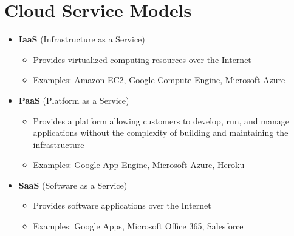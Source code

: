 \section{Cloud Service Models}
\begin{itemize}
   \item \textbf{IaaS} (Infrastructure as a Service)
   \begin{itemize}
      \item Provides virtualized computing resources over the Internet
      \item Examples: Amazon EC2, Google Compute Engine, Microsoft Azure
   \end{itemize}
   \item \textbf{PaaS} (Platform as a Service)
   \begin{itemize}
      \item Provides a platform allowing customers to develop, run, and manage applications without the complexity of building and maintaining the infrastructure
      \item Examples: Google App Engine, Microsoft Azure, Heroku
   \end{itemize}
   \item \textbf{SaaS} (Software as a Service)
   \begin{itemize}
      \item Provides software applications over the Internet
      \item Examples: Google Apps, Microsoft Office 365, Salesforce
   \end{itemize}
\end{itemize}

